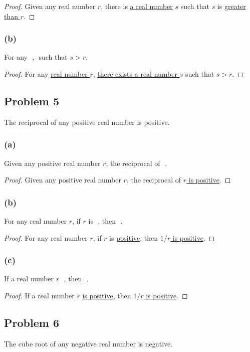 \documentclass[14pt]{extarticle}
\newcommand{\fbl}{\underline{\hspace{1cm}}\,\,}
\begin{document}
\begin{proof}
Given any real number $r$, there is \underline{a real number} $s$ such that $s$ is \underline{greater than $r$}.
\end{proof}

\subsubsection{(b)}
For any \fbl, \fbl such that $s > r$.

\begin{proof}
For any \underline{real number $r$}, \underline{there exists a real number $s$} such that $s > r$.
\end{proof}

\subsection{Problem 5}
The reciprocal of any positive real number is positive.

\subsubsection{(a)}
Given any positive real number $r$, the reciprocal of \fbl.

\begin{proof}
Given any positive real number $r$, the reciprocal of \underline{$r$ is positive}.
\end{proof}

\subsubsection{(b)}
For any real number $r$, if $r$ is \fbl, then \fbl. 

\begin{proof}
For any real number $r$, if $r$ is \underline{positive}, then \underline{$1/r$ is positive}. 
\end{proof}

\subsubsection{(c)}
If a real number $r$ \fbl, then \fbl.

\begin{proof}
If a real number $r$ \underline{is positive}, then \underline{$1/r$ is positive}.
\end{proof}

\subsection{Problem 6}
The cube root of any negative real number is negative.
\end{document}
